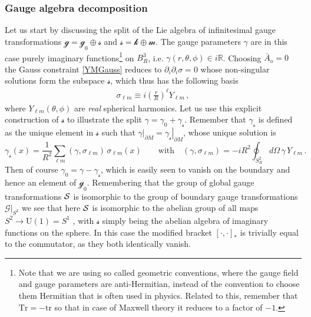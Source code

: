 \documentclass[11pt,a4paper]{article}
\def\calg{{\mathscr G}}
\def\calsk{\boldsymbol{\mathscr k}}
\def\calsg{{\boldsymbol{\mathscr g}}}
\def\calsm{{\boldsymbol{\mathscr m}}}
\def\cals{{\cal S}}
\def\calss{{\boldsymbol{\mathscr s}}}
\def\Tr{\mathrm{Tr}}
\def\tr{\mathrm{tr}}
\begin{document}
            \subsubsection{Gauge algebra decomposition}
            Let us start by discussing the split of the Lie algebra of infinitesimal gauge transformations $\calsg=\calsg_0\oplus\calss$ and $\calss=\calsk\oplus\calsm$. The gauge parameters $\gamma$ are in this case purely imaginary functions\footnote{Note that we are using so called geometric conventions, where the gauge field and gauge parameters are anti-Hermitian, instead of the convention to choose them Hermitian that is often used in physics. Related to this, remember that $\Tr=-\tr$ so that in case of Maxwell theory it reduces to a factor of $-1$.} on $B_R^3$, i.e. $\gamma(r,\theta,\phi)\in i\mathbb{R}$.
          	Choosing $\bar A_o=0$ the Gauss constraint \eqref{YMGauss} reduces to $\partial_i\partial_i \sigma=0$ whose non-singular solutions form the subspace $\calss$, which thus has the following basis 
          	\begin{align}
            \sigma_{\ell m}\equiv i\left(\frac{r}{R}\right)^\ell Y_{\ell m}\,,
          	\end{align}
          	where $Y_{\ell m}(\theta,\phi)$ are {\it real} spherical harmonics. 
          	Let us use this explicit construction of $\calss$ to illustrate the split $\gamma=\gamma_0+\gamma_\calss$. Remember that $\gamma_\calss$ is defined as the unique element in $\calss$ such that $\left.\gamma\right|_{\partial M}=\left.\gamma_\calss\right|_{\partial M}$, whose unique solution is 
          	\begin{equation}
          	\gamma_\calss(x)=\frac{1}{R^2}\sum_{\ell m}(\gamma,\sigma_{\ell m})\,\sigma_{\ell m}(x)\qquad\mbox{with}\quad (\gamma,\sigma_{\ell m})=-iR^2\oint_{S^2_R}\! d\Omega\, \gamma\, Y_{\ell m}\,.\label{maxproj}
          	\end{equation}
          	Then of course $\gamma_0=\gamma-\gamma_\calss$, which is easily seen to vanish on the boundary and hence an element of $\calsg_0$. Remembering that the group of global gauge transformations $\cals$ is isomorphic to the group of boundary gauge transformations $\left.\calg\right|_{S^2}$ we see that here $\cals$ is isomorphic to the abelian group of all maps $S^2\rightarrow {\mathrm{U}}(1)=S^1$ , with $\calss$ simply being the abelian algebra of imaginary functions on the sphere. In this case the modified bracket $[\cdot,\cdot]_*$ is trivially equal to the commutator, as they both identically vanish.
          	
\end{document}
